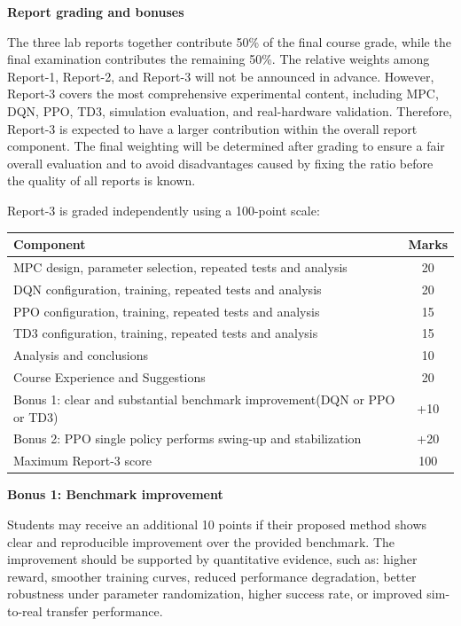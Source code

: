 \documentclass[11pt,a4paper]{article}
\begin{document}
\begin{requirementbox}
\textbf{Report grading and bonuses}

The three lab reports together contribute 50\% of the final course grade,
while the final examination contributes the remaining 50\%.
The relative weights among Report-1, Report-2, and Report-3 will not be
announced in advance. However, Report-3 covers the most comprehensive
experimental content, including MPC, DQN, PPO, TD3, simulation evaluation,
and real-hardware validation. Therefore, Report-3 is expected to have a
larger contribution within the overall report component.
The final weighting will be determined after grading to ensure a fair
overall evaluation and to avoid disadvantages caused by fixing the ratio
before the quality of all reports is known.

Report-3 is graded independently using a 100-point scale:

\begin{center}
\begin{tabularx}{0.96\linewidth}{Y C}
\toprule
Component & Marks\\
\midrule
MPC design, parameter selection, repeated tests and analysis & 20\\
DQN configuration, training, repeated tests and analysis &20\\
PPO configuration, training, repeated tests and analysis & 15\\
TD3 configuration, training, repeated tests and analysis & 15\\
Analysis and conclusions & 10\\
Course Experience and Suggestions & 20\\
\midrule
Bonus 1: clear and substantial benchmark improvement(DQN or PPO or TD3) & +10\\
Bonus 2: PPO single policy performs swing-up and stabilization & +20\\
\midrule
Maximum Report-3 score & 100\\
\bottomrule
\end{tabularx}
\end{center}

\textbf{Bonus 1: Benchmark improvement}

Students may receive an additional 10 points if their proposed method
shows clear and reproducible improvement over the provided benchmark.
The improvement should be supported by quantitative evidence, such as:
higher reward, smoother training curves, reduced performance degradation,
better robustness under parameter randomization, higher success rate,
or improved sim-to-real transfer performance.


\end{requirementbox}
\end{document}
